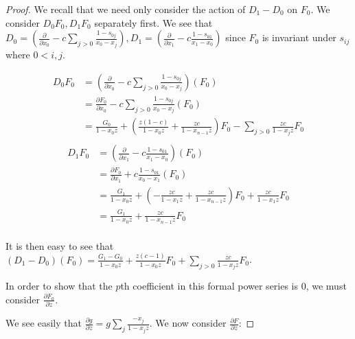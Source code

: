\documentclass{article}
\numberwithin{equation}{section}
\begin{document}
\begin{proof}
We recall that we need only consider the action of $D_1-D_0$ on $F_0$. We consider $D_0F_0, D_1F_0$ separately first. We see that $D_0=\left(\frac{\partial}{\partial x_0}-c\sum_{j > 0} \frac{1-s_{0j}}{x_0-x_j}\right), D_1=\left(\frac{\partial}{\partial x_1}-c \frac{1-s_{01}}{x_1-x_0}\right)$ since $F_0$ is invariant under $s_{ij}$ where $0 < i,j$. 

\begin{align*}
D_0F_0&=\left(\frac{\partial}{\partial x_0}-c\sum_{j > 0} \frac{1-s_{0j}}{x_0-x_j}\right)(F_0)\\
&=\frac{\partial F_0}{\partial x_0}-c\sum_{j > 0} \frac{1-s_{0j}}{x_0-x_j}(F_0)\\
&=\frac{G_0}{1-x_0z}+\left(\frac{z(1-c)}{1-x_0z}+\frac{zc}{1-x_{n-1}z}\right)F_0-\sum_{j > 0} \frac{zc}{1-x_jz}F_0\\
\end{align*}
\begin{align*}
D_1F_0&=\left(\frac{\partial}{\partial x_1}-c \frac{1-s_{01}}{x_1-x_0}\right)(F_0)\\
&=\frac{\partial F_0}{\partial x_1}+c \frac{1-s_{01}}{x_0-x_1}(F_0)\\
&=\frac{G_1}{1-x_0z}+\left(-\frac{zc}{1-x_1z}+\frac{zc}{1-x_{n-1}z}\right)F_0+\frac{zc}{1-x_1z}F_0\\
&=\frac{G_1}{1-x_0z}+\frac{zc}{1-x_{n-1}z}F_0\\
\end{align*}

It is then easy to see that $(D_1-D_0)(F_0)=\frac{G_1-G_0}{1-x_0z}+\frac{z(c-1)}{1-x_0z}F_0+\sum_{j>0} \frac{zc}{1-x_jz}F_0$. 

In order to show that the $p$th coefficient in this formal power series is $0$, we must consider $\frac{\partial F_0}{\partial z}$. 

We see easily that $\frac{\partial g}{\partial z} = g \sum_j \frac{-x_j}{1-x_jz}$. We now consider $\frac{\partial F}{\partial z}$:


\end{proof}
\end{document}
